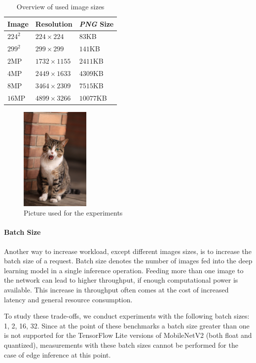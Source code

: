 \begin{table}[!htb]
\centering
\caption{Overview of used image sizes}
\label{table:imagesOverview}
\begin{tabular}{@{}lll@{}}
\toprule
Image   & Resolution       & \emph{PNG} Size  \\ \midrule
$224^2$ & $224\times224$   & $83$KB    \\
$299^2$ & $299\times299$   & $141$KB   \\
$2$MP   & $1732\times1155$ & $2411$KB  \\
$4$MP   & $2449\times1633$ & $4309$KB  \\
$8$MP   & $3464\times2309$ & $7515$KB  \\
$16$MP  & $4899\times3266$ & $10077$KB \\ \bottomrule
\end{tabular}
\end{table}
\begin{figure}[!htb]
\centering
\includegraphics[width=0.3\textwidth]{./Bilder/European_cat_compressed.jpg}
\caption{Picture used for the experiments \cite{cat}}
\label{fig:cat}
\end{figure}
\paragraph{Batch Size}
Another way to increase workload, except different images sizes, is to increase the batch size of a request.
Batch size denotes the number of images fed into the deep learning model in a single inference operation. 
Feeding more than one image to the network can lead to higher throughput, if enough computational power is available. This increase in throughput often comes at the cost of increased latency and general resource consumption.

To study these trade-offs, we conduct experiments with the following batch sizes: 1, 2, 16, 32. Since at the point of these benchmarks a batch size greater than one is not supported for the TensorFlow Lite versions of MobileNetV2 (both float and quantized), measurements with these batch sizes cannot be performed for the case of edge inference at this point.

